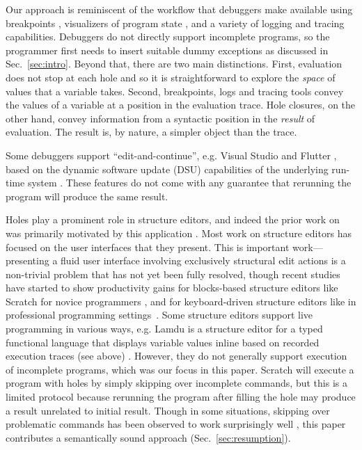 
Our approach is reminiscent of the workflow that debuggers make available using breakpoints \cite{fitzgerald2008debugging,DBLP:journals/jfp/TolmachA95}, visualizers of program state \cite{Nelson2017,Guo13}, and a variety of logging and tracing capabilities.
%
Debuggers do not directly support incomplete programs, so the programmer first needs to insert suitable dummy exceptions as discussed in Sec.~\ref{sec:intro}.
%
Beyond that, there are two main distinctions. First, evaluation does not stop at each hole and so it is straightforward to explore the \emph{space} of values that a variable takes. Second, breakpoints, logs and tracing tools convey the values of a variable at a position in the evaluation trace. Hole closures, on the other hand, convey information from a syntactic position in the \emph{result} of evaluation. The result is, by nature, a simpler object than the trace. %

Some debuggers support ``edit-and-continue'', e.g. Visual Studio \cite{VSEditAndContinue} and Flutter \cite{flutter}, based on the dynamic software update (DSU) capabilities of the underlying run-time system \cite{DBLP:journals/toplas/StoyleHBSN07,DBLP:conf/vstte/HaydenMHFF12,DBLP:journals/toplas/HicksN05}. These features do not come with any guarantee that rerunning the program will produce the same result.



Holes play a prominent role in structure editors, and indeed the prior work on \Hazelnut was primarily motivated by this application \cite{popl-paper}. 
Most work on structure editors has focused on the user interfaces that they
present. This is important work---presenting a fluid user interface involving
exclusively structural edit actions is a non-trivial problem that has not yet
been fully resolved, though recent studies have started to show productivity
gains for blocks-based structure editors like Scratch for novice programmers \cite{Resnick:2009:SP:1592761.1592779,DBLP:conf/chi/WeintropASFLSF18,DBLP:conf/acmidc/WeintropW15}, and for keyboard-driven structure
editors like  in professional programming settings~\cite{DBLP:conf/vl/Asenov014,DBLP:conf/sle/VolterSBK14,voelter_mbeddr:_2012}.
%
Some structure editors support live programming in various ways, e.g. Lamdu is a structure editor for a typed functional language that displays variable values inline based on recorded execution traces (see above) \cite{lamdu}. However, they do not generally support execution of incomplete programs, which was our focus in this paper. Scratch will execute a program with holes by simply skipping over incomplete commands, but this is a limited protocol because rerunning the program after filling the hole may produce a result unrelated to initial result. Though in some situations, skipping over problematic commands has been observed to work surprisingly well \cite{DBLP:conf/dac/Rinard12}, this paper contributes a semantically sound approach (Sec.~\ref{sec:resumption}). 

